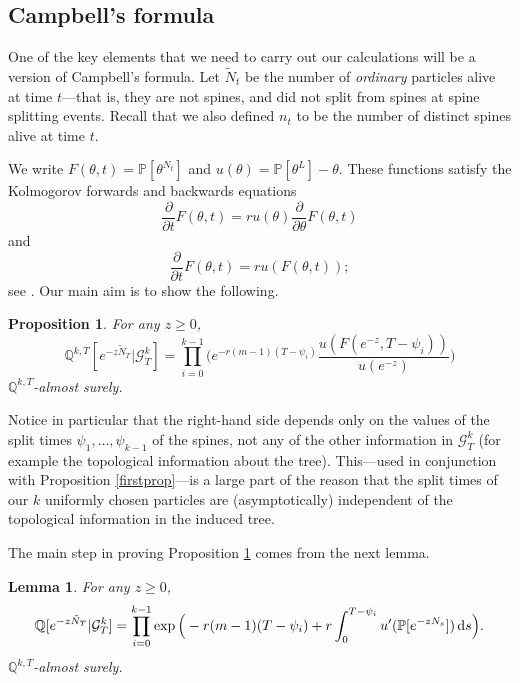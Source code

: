 \documentclass{article}
\theoremstyle{plain}
\newtheorem{lem}[thm]{Lemma}
\newtheorem{prop}[thm]{Proposition}
\theoremstyle{definition}
\newcommand{\Q}{\mathbb{Q}}
\renewcommand{\P}{\mathbb{P}}
\newcommand{\G}{\mathcal{G}}
\renewcommand{\d}{{\rm{d}}}
\begin{document}
\subsection{Campbell's formula}

One of the key elements that we need to carry out our calculations will be a version of Campbell's formula. Let $\tilde N_t$ be the number of \emph{ordinary} particles alive at time $t$---that is, they are not spines, and did not split from spines at spine splitting events. Recall that we also defined $n_t$ to be the number of distinct spines alive at time $t$.

We write $F(\theta,t) = \P[\theta^{N_t}]$ and $u(\theta) = \P[\theta^L]-\theta$. These functions satisfy the Kolmogorov forwards and backwards equations
\begin{equation}\label{kolfor}
\frac{\partial}{\partial t} F(\theta,t) = ru(\theta)\frac{\partial}{\partial\theta} F(\theta,t)
\end{equation}
and
\begin{equation}\label{kolback}
\frac{\partial}{\partial t} F(\theta,t) = ru(F(\theta,t));
\end{equation}
see \cite[Chapter III, Section 3]{athreya_ney:branching_processes}. Our main aim is to show the following.

\begin{prop}\label{Qmgf_gen_prop}
For any $z\ge 0$,
\[\Q^{k,T}[e^{-z\tilde N_T}|\G^k_T] = \prod_{i=0}^{k-1}\Big(e^{-r(m-1)(T-\psi_i)}\frac{u(F(e^{-z},T-\psi_i))}{u(e^{-z})}\Big)\]
$\Q^{k,T}$-almost surely.
\end{prop}

Notice in particular that the right-hand side depends only on the values of the split times $\psi_1,\dots,\psi_{k-1}$ of the spines, not any of the other information in $\G^k_T$ (for example the topological information about the tree). This---used in conjunction with Proposition \ref{firstprop}---is a large part of the reason that the split times of our $k$ uniformly chosen particles are (asymptotically) independent of the topological information in the induced tree.

The main step in proving Proposition \ref{Qmgf_gen_prop} comes from the next lemma.

\begin{lem}\label{Qmgf_gen}
For any $z\ge 0$,
\[\Q[e^{-z\tilde N_T}|\G^k_T] = \prod_{i=0}^{k-1} \exp\Big( -r(m-1)(T-\psi_i) + r \int_0^{T-\psi_i} u'(\P[e^{-zN_{s}}])\, \d s\Big).\]
$\Q^{k,T}$-almost surely.
\end{lem}
\end{document}
